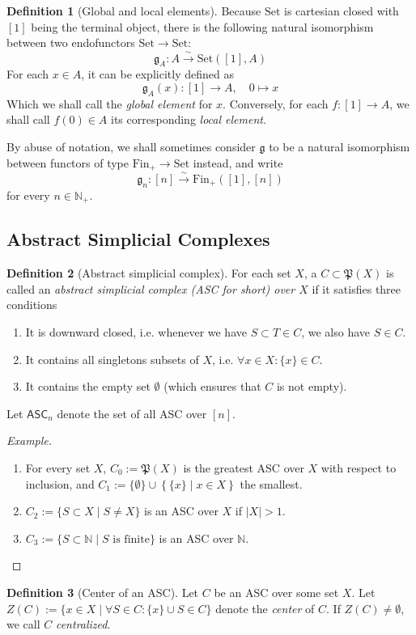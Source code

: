 \documentclass{article}
\theoremstyle{remark}
\theoremstyle{definition}
\newtheorem{definition}{Definition}[subsection]
\newcommand{\N}{\mathbb N}
\newcommand{\Fin}{\mathrm{Fin}}
\newcommand{\Set}{\mathrm{Set}}
\newcommand{\p}{\mathfrak P}
\newcommand{\ASC}{\mathsf{ASC}}
\newcommand{\g}{\mathfrak g}
\newenvironment{example}{\begin{proof}[Example]}{\end{proof}}
\begin{document}
	\begin{definition}[Global and local elements]
		Because $\Set$ is cartesian closed with $[1]$ being the terminal object, there is the following natural isomorphism between two endofunctors $\Set\to\Set$:
		\[\g_A:A\xrightarrow\sim\Set([1],A)\]
		For each $x\in A$, it can be explicitly defined as
		\[\g_A(x):[1]\to A,\quad 0\mapsto x\]
		Which we shall call the \textit{global element} for $x$. Conversely, for each $f:[1]\to A$, we shall call $f(0)\in A$ its corresponding \textit{local element}.
		
		By abuse of notation, we shall sometimes consider $\g$ to be a natural isomorphism between functors of type $\Fin_+\to\Set$ instead, and write
		\[\g_n:[n]\xrightarrow\sim\Fin_+([1],[n])\]
		for every $n\in\N_+$.
	\end{definition}
	\subsection{Abstract Simplicial Complexes}
	\begin{definition}[Abstract simplicial complex]
		For each set $X$, a $C\subset\p(X)$ is called an \textit{abstract simplicial complex (ASC for short) over $X$} if it satisfies three conditions
		\begin{enumerate}
			\item It is downward closed, i.e. whenever we have $S\subset T\in C$, we also have $S\in C$.
			\item It contains all singletons subsets of $X$, i.e. $\forall x\in X:\{x\}\in C$.
			\item It contains the empty set $\emptyset$ (which ensures that $C$ is not empty).
		\end{enumerate}
		Let $\ASC_n$ denote the set of all ASC over $[n]$.
	\end{definition}
	\begin{example}
		\begin{enumerate}
			\item For every set $X$, $C_0:=\p(X)$ is the greatest ASC over $X$ with respect to inclusion, and $C_1:=\{\emptyset\}\cup\left\{\{x\}\mid x\in X\right\}$ the smallest.
			\item $C_2:=\{S\subset X\mid S\neq X\}$ is an ASC over $X$ if $|X|>1$.
			\item $C_3:=\{S\subset \N\mid S\text{ is finite}\}$ is an ASC over $\N$.
		\end{enumerate}
	\end{example}
	\begin{definition}[Center of an ASC]
		Let $C$ be an ASC over some set $X$. Let $Z(C):=\{x\in X\mid\forall S\in C: \{x\}\cup S\in C\}$ denote the \textit{center} of $C$. If $Z(C)\neq\emptyset$, we call $C$ \textit{centralized}.
	\end{definition}
\end{document}
